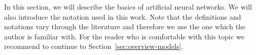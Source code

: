 
\newcommand{\argmin}{\operatornamewithlimits{arg\,min}}
\newcommand{\Bx}{{\bf x} }
\newcommand{\By}{{\bf y} }
\newcommand{\Bh}{{\bf h} }
\newcommand{\Bw}{{\bf w} }
\newcommand{\Bc}{{\bf c} }

In this section, we will describe the basics of artificial neural networks. We will also introduce the notation used in this work. Note that the definitions and notations vary through the literature and therefore we use the one which the author is familiar with. For the reader who is comfortable with this topic we recommend to continue to Section~\ref{sec:overview-models}. 

 
\label{sec:perceptron} 



 

 
